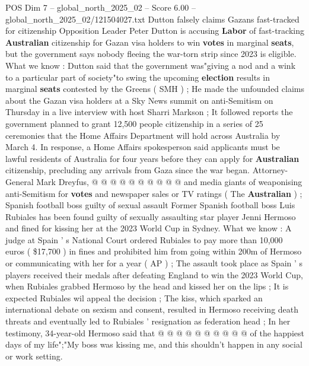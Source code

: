 \begin{textsample}{POS Dim 7 – global\_north\_2025\_02 – Score 6.00 – global\_north\_2025\_02/121504027.txt}  \label{ex:f7_pos_283}
Dutton falsely claims Gazans fast-tracked for citizenship Opposition Leader Peter Dutton is accusing \textbf{Labor} of fast-tracking \textbf{Australian} citizenship for Gazan visa holders to win \textbf{votes} in marginal \textbf{seats}, but the government says nobody fleeing the war-torn strip since 2023 is eligible.
What we know : Dutton said that the government was"giving a nod and a wink to a particular part of society"to swing the upcoming \textbf{election} results in marginal \textbf{seats} contested by the Greens ( SMH ) ; He made the unfounded claims about the Gazan visa holders at a Sky News summit on anti-Semitism on Thursday in a live interview with host Sharri Markson ; It followed reports the government planned to grant 12,500 people citizenship in a series of 25 ceremonies that the Home Affairs Department will hold across Australia by March 4.
In response, a Home Affairs spokesperson said applicants must be lawful residents of Australia for four years before they can apply for \textbf{Australian} citizenship, precluding any arrivals from Gaza since the war began.
Attorney-General Mark Dreyfus, @ @ @ @ @ @ @ @ @ @ and media giants of weaponising anti-Semitism for \textbf{votes} and newspaper sales or TV ratings ( The \textbf{Australian} ) ; Spanish football boss guilty of sexual assault Former Spanish football boss Luis Rubiales has been found guilty of sexually assaulting star player Jenni Hermoso and fined for kissing her at the 2023 World Cup in Sydney.
What we know : A judge at Spain ' s National Court ordered Rubiales to pay more than 10,000 euros ( \$17,700 ) in fines and prohibited him from going within 200m of Hermoso or communicating with her for a year ( AP ) ; The assault took place as Spain ' s players received their medals after defeating England to win the 2023 World Cup, when Rubiales grabbed Hermoso by the head and kissed her on the lips ; It is expected Rubiales wil appeal the decision ; The kiss, which sparked an international debate on sexism and consent, resulted in Hermoso receiving death threats and eventually led to Rubiales ' resignation as federation head ; In her testimony, 34-year-old Hermoso said that @ @ @ @ @ @ @ @ @ @ of the happiest days of my life";"My boss was kissing me, and this shouldn't happen in any social or work setting.

\end{textsample}
